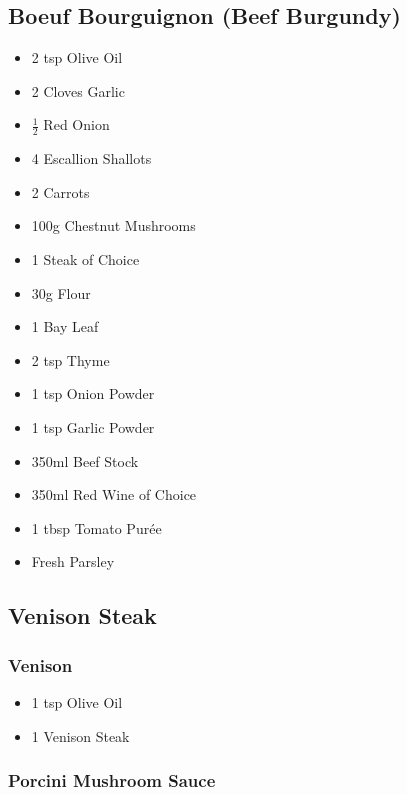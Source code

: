 \documentclass[11pt, english]{article}
\begin{document}
\newpage

	\subsection{Boeuf Bourguignon (Beef Burgundy)}

	\begin{itemize}
	\setlength\itemsep{0cm}
		\item 2 tsp Olive Oil
		\item 2 Cloves Garlic
		\item $\frac{1}{2}$ Red Onion
		\item 4 Escallion Shallots
		\item 2 Carrots
		\item 100g Chestnut Mushrooms
		\item 1 Steak of Choice
		\item 30g Flour
		\item 1 Bay Leaf
		\item 2 tsp Thyme
		\item 1 tsp Onion Powder
		\item 1 tsp Garlic Powder
		\item 350ml Beef Stock
		\item 350ml Red Wine of Choice
		\item 1 tbsp Tomato Pur\'{e}e 
		\item Fresh Parsley
	\end{itemize}

\newpage

	\subsection{Venison Steak}

		\subsubsection*{Venison}

	\begin{itemize}
        \setlength\itemsep{0cm}
                \item 1 tsp Olive Oil
		\item 1 Venison Steak
        \end{itemize}

		\subsubsection*{Porcini Mushroom Sauce}
\end{document}
